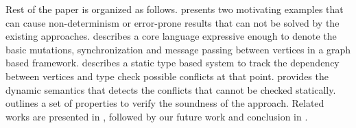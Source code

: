 Rest of the paper is organized as follows.  presents two motivating examples that can cause non-determinism or error-prone results that can not be solved by the existing approaches.  describes a core language expressive enough to denote the basic mutations, synchronization and message passing between vertices in a graph based framework.  describes a static type based system to track the dependency between vertices and type check possible conflicts at that point.  provides the dynamic semantics that detects the conflicts that cannot be checked statically.  outlines a set of properties to verify the soundness of the approach. Related works are presented in , followed by our future work and conclusion in .





